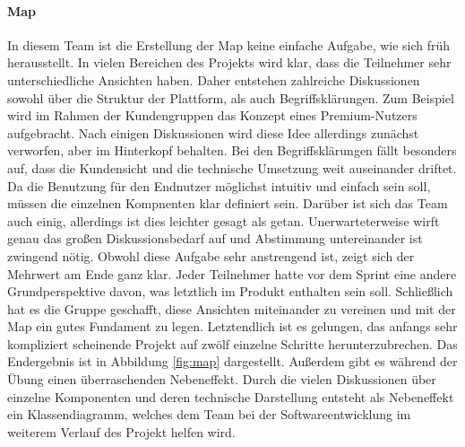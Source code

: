 \paragraph{Map}
In diesem Team ist die Erstellung der Map keine einfache Aufgabe, wie sich früh herausstellt. In vielen Bereichen des Projekts wird klar, dass die Teilnehmer sehr unterschiedliche Ansichten haben. Daher entstehen zahlreiche Diskussionen sowohl über die Struktur der Plattform, als auch Begriffsklärungen. Zum Beispiel wird im Rahmen der Kundengruppen das Konzept eines Premium-Nutzers aufgebracht. Nach einigen Diskussionen wird diese Idee allerdings zunächst verworfen, aber im Hinterkopf behalten. Bei den Begriffsklärungen fällt besonders auf, dass die Kundensicht und die technische Umsetzung weit auseinander driftet. Da die Benutzung für den Endnutzer möglichst intuitiv und einfach sein soll, müssen die einzelnen Kompnenten klar definiert sein. Darüber ist sich das Team auch einig, allerdings ist dies leichter gesagt als getan. Unerwarteterweise wirft genau das großen Diskussionsbedarf auf und Abstimmung untereinander ist zwingend nötig. Obwohl diese Aufgabe sehr anstrengend ist, zeigt sich der Mehrwert am Ende ganz klar. Jeder Teilnehmer hatte vor dem Sprint eine andere Grundperspektive davon, was letztlich im Produkt enthalten sein soll. Schließlich hat es die Gruppe geschafft, diese Ansichten miteinander zu vereinen und mit der Map ein gutes Fundament zu legen. Letztendlich ist es gelungen, das anfangs sehr kompliziert scheinende Projekt auf zwölf einzelne Schritte herunterzubrechen. Das Endergebnis ist in Abbildung \ref{fig:map} dargestellt. Außerdem gibt es während der Übung einen überraschenden Nebeneffekt. Durch die vielen Diskussionen über einzelne Komponenten und deren technische Darstellung entsteht als Nebeneffekt ein Klassendiagramm, welches dem Team bei der Softwareentwicklung im weiterem Verlauf des Projekt helfen wird.



